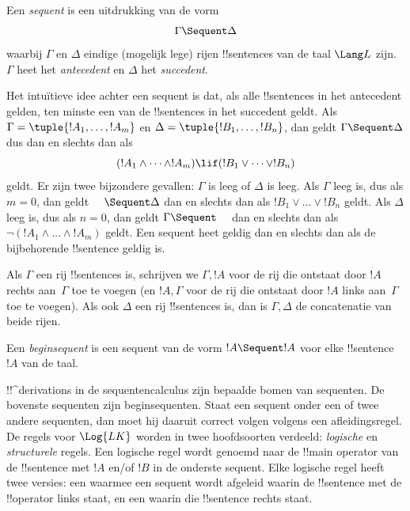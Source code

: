 \documentclass[openany]{memoir}
\begin{document}
\begin{defn}[Sequent]
Een \emph{sequent} is een uitdrukking van de vorm
\[
\Gamma \Sequent \Delta
\]
waarbij $\Gamma$ en $\Delta$ eindige (mogelijk lege) rijen
!!{sentence}s van de taal $\Lang L$ zijn. $\Gamma$ heet het
\emph{antecedent} en $\Delta$ het \emph{succedent}.
\end{defn}

\begin{explain}
Het intuïtieve idee achter een sequent is dat, als alle !!{sentence}s
in het antecedent gelden, ten minste een van de !!{sentence}s in het
succedent geldt. Als $\Gamma = \tuple{!A_1, \dots, !A_m}$ en $\Delta =
\tuple{!B_1, \dots, !B_n}$, dan geldt $\Gamma \Sequent \Delta$ dus dan
en slechts dan als
\[
(!A_1 \land \cdots \land !A_m) \lif (!B_1 \lor \cdots \lor
!B_n)
\]
geldt. Er zijn twee bijzondere gevallen: $\Gamma$ is leeg of $\Delta$
is leeg. Als $\Gamma$ leeg is, dus als $m = 0$, dan geldt $\quad
\Sequent \Delta$ dan en slechts dan als $!B_1 \lor \dots \lor !B_n$
geldt. Als $\Delta$ leeg is, dus als $n = 0$, dan geldt $\Gamma
\Sequent \quad$ dan en slechts dan als $\lnot(!A_1 \land \dots \land
!A_m)$ geldt. Een sequent heet geldig dan en slechts dan als de
bijbehorende !!{sentence} geldig is.
\end{explain}

Als $\Gamma$ een rij !!{sentence}s is, schrijven we $\Gamma, !A$ voor
de rij die ontstaat door $!A$ rechts aan~$\Gamma$ toe te voegen (en
$!A, \Gamma$ voor de rij die ontstaat door $!A$ links aan~$\Gamma$ toe
te voegen). Als ook $\Delta$ een rij !!{sentence}s is, dan is $\Gamma,
\Delta$ de concatenatie van beide rijen.

\begin{defn}[Beginsequent]
Een \emph{beginsequent} is een sequent
{van de vorm $!A \Sequent !A$} voor elke !!{sentence} $!A$ van de taal.
\end{defn}

!!^{derivation}s in de sequentencalculus zijn bepaalde bomen van
sequenten. De bovenste sequenten zijn beginsequenten. Staat een sequent
onder een of twee andere sequenten, dan moet hij daaruit correct volgen
volgens een afleidingsregel. De regels voor $\Log{LK}$ worden in twee
hoofdsoorten verdeeld: \emph{logische} en \emph{structurele} regels.
Een logische regel wordt genoemd naar de !!{main operator} van de
!!{sentence} met $!A$ en/of $!B$ in de onderste sequent. Elke logische
regel heeft twee versies: een waarmee een sequent wordt afgeleid waarin
de !!{sentence} met de !!{operator} links staat, en een waarin die
!!{sentence} rechts staat.
\endgroup
\end{document}
